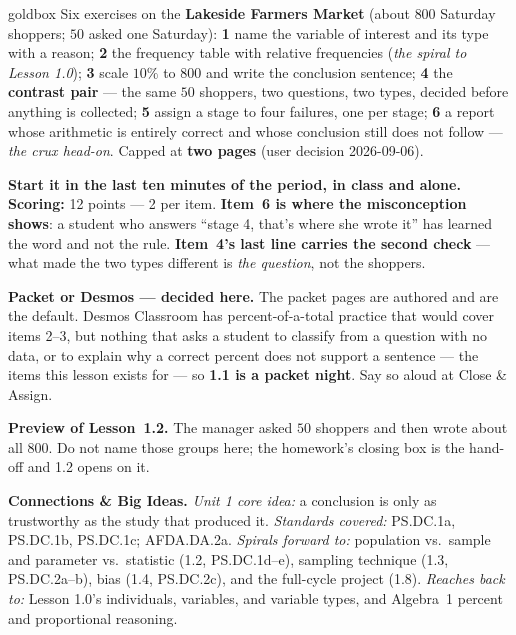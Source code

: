 \documentclass[10pt]{article}
\begin{document}
\boxguard
\begin{skillbox}{goldbox}
Six exercises on the \textbf{Lakeside Farmers Market} (about $800$ Saturday shoppers; $50$
asked one Saturday): \textbf{1} name the variable of interest and its type with a reason;
\textbf{2} the frequency table with relative frequencies (\emph{the spiral to Lesson 1.0});
\textbf{3} scale $10\%$ to $800$ and write the conclusion sentence; \textbf{4} the
\textbf{contrast pair} --- the same $50$ shoppers, two questions, two types, decided before
anything is collected; \textbf{5} assign a stage to four failures, one per stage;
\textbf{6} a report whose arithmetic is entirely correct and whose conclusion still does not
follow --- \emph{the crux head-on}. Capped at \textbf{two pages} (user decision 2026-09-06).

\textbf{Start it in the last ten minutes of the period, in class and alone.} \textbf{Scoring:}
12 points --- 2 per item. \textbf{Item~6 is where the misconception shows}: a student who
answers ``stage 4, that's where she wrote it'' has learned the word and not the rule.
\textbf{Item~4's last line carries the second check} --- what made the two types different is
\emph{the question}, not the shoppers.

\textbf{Packet or Desmos --- decided here.} The packet pages are authored and are the default.
Desmos Classroom has percent-of-a-total practice that would cover items 2--3, but nothing that
asks a student to classify from a question with no data, or to explain why a correct percent
does not support a sentence --- the items this lesson exists for --- so \textbf{1.1 is a
packet night}. Say so aloud at Close \& Assign.

\textbf{Preview of Lesson~1.2.} The manager asked $50$ shoppers and then wrote about all
$800$. Do not name those groups here; the homework's closing box is the hand-off and 1.2 opens
on it.

\textbf{Connections \& Big Ideas.} \textit{Unit 1 core idea:} a conclusion is only as
trustworthy as the study that produced it. \textit{Standards covered:} PS.DC.1a, PS.DC.1b,
PS.DC.1c; AFDA.DA.2a. \textit{Spirals forward to:} population vs.\ sample and parameter vs.\
statistic (1.2, PS.DC.1d--e), sampling technique (1.3, PS.DC.2a--b), bias (1.4, PS.DC.2c), and
the full-cycle project (1.8). \textit{Reaches back to:} Lesson 1.0's individuals, variables,
and variable types, and Algebra~1 percent and proportional reasoning.
\end{skillbox}
\end{document}
